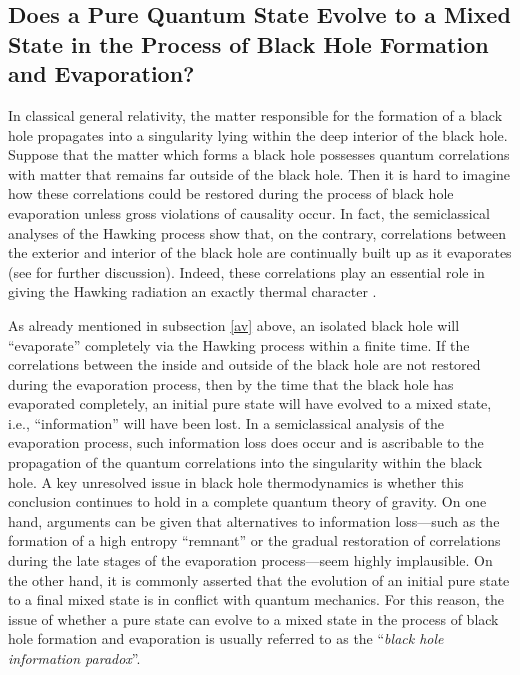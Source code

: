 \subsection{Does a Pure Quantum State Evolve to a Mixed State in the 
Process of Black Hole Formation and Evaporation?}
\label{pm}

In classical general relativity, the matter responsible for the
formation of a black hole propagates into a singularity lying within
the deep interior of the black hole. Suppose that the matter which
forms a black hole possesses quantum correlations with matter that
remains far outside of the black hole. Then it is hard to imagine how
these correlations could be restored during the process of black hole
evaporation unless gross violations of causality occur. In fact, the
semiclassical analyses of the Hawking process show that, on the
contrary, correlations between the exterior and interior of the black
hole are continually built up as it evaporates (see \cite{w4} for
further discussion). Indeed, these correlations play an essential role
in giving the Hawking radiation an exactly thermal character
\cite{w7}.

As already mentioned in subsection \ref{av} above, an isolated black
hole will ``evaporate'' completely via the Hawking process within a
finite time. If the correlations between the inside and outside of the
black hole are not restored during the evaporation process, then by
the time that the black hole has evaporated completely, an initial
pure state will have evolved to a mixed state, i.e., ``information''
will have been lost. In a semiclassical analysis of the evaporation
process, such information loss does occur and is ascribable to the
propagation of the quantum correlations into the singularity within
the black hole. A key unresolved issue in black hole thermodynamics is
whether this conclusion continues to hold in a complete quantum theory
of gravity. On one hand, arguments can be given \cite{w4} that
alternatives to information loss---such as the formation of a high
entropy ``remnant'' or the gradual restoration of correlations during
the late stages of the evaporation process---seem highly
implausible. On the other hand, it is commonly asserted that the
evolution of an initial pure state to a final mixed state is
in conflict with quantum mechanics. For this reason, the issue of
whether a pure state can evolve to a mixed state in the process of
black hole formation and evaporation is usually referred to as the
``{\it black hole information paradox}''.

